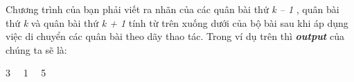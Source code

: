 Chương trình của bạn phải viết ra nhãn của các quân bài thứ \emph{ k – 1 } , quân bài thứ \emph{ k } và quân bài thứ \emph{ k + 1 } tính từ trên xuống dưới của bộ bài sau khi áp dụng việc di chuyển các quân bài theo dãy thao tác. Trong ví dụ trên thì \textbf{\emph{ output }} của chúng ta sẽ là:

3   1   5

\